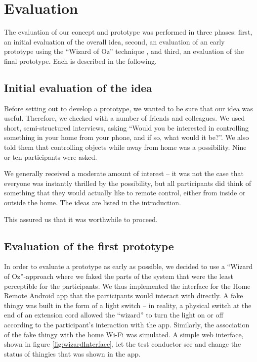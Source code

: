 \documentclass{ubicomp2012}
\begin{document}
\section{Evaluation}

The evaluation of our concept and prototype was performed in three phases: first, an initial evaluation of the overall idea, second, an evaluation of an early prototype using the ``Wizard of Oz'' technique \cite{wizardOfOz}, and third, an evaluation of the final prototype. Each is described in the following.
\subsection{Initial evaluation of the idea}

Before setting out to develop a prototype, we wanted to be sure that our idea was useful. Therefore, we checked with a number of friends and colleagues. We used short, semi-structured interviews, asking ``Would you be interested in controlling something in your home from your phone, and if so, what would it be?''. We also told them that controlling objects while away from home was a possibility. Nine or ten participants were asked.

We generally received a moderate amount of interest -- it was not the case that everyone was instantly thrilled by the possibility, but all participants did think of something that they would actually like to remote control, either from inside or outside the home. The ideas are listed in the introduction.

This assured us that it was worthwhile to proceed.
\subsection{Evaluation of the first prototype}

In order to evaluate a prototype as early as possible, we decided to use a ``Wizard of Oz''-approach where we faked the parts of the system that were the least perceptible for the participants. We thus implemented the interface for the Home Remote Android app that the participants would interact with directly. A fake thingy was built in the form of a light switch -- in reality, a physical switch at the end of an extension cord allowed the ``wizard'' to turn the light on or off according to the participant's interaction with the app. Similarly, the association of the fake thingy with the home Wi-Fi was simulated. A simple web interface, shown in figure \ref{fig:wizardInterface}, let the test conductor see and change the status of thingies that was shown in the app.
\end{document}

